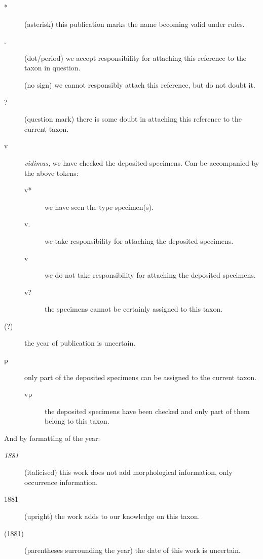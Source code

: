 \documentclass[notuftebib,font=source,UKenglish]{tufte-lualatex}
\begin{document}
\begin{description}
    \item[*] (asterisk) this publication marks the name becoming valid under
         rules.
    \item[.] (dot/period) we accept responsibility for attaching this reference
        to the taxon in question.
    \item[] (no sign) we cannot responsibly attach this reference, but do not
        doubt it.
    \item[?] (question mark) there is some doubt in attaching this reference to
        the current taxon.
    \item[v] \emph{vidimus,} we have checked the deposited specimens. Can be
        accompanied by the above tokens:
        \begin{description}
            \item[v*] we have seen the type specimen(s).
            \item[v.] we take responsibility for attaching the deposited specimens.
            \item[v] we do not take responsibility for attaching the deposited
                specimens.
            \item[v?] the specimens cannot be certainly assigned to this taxon.
        \end{description}
    \item[(?)] the year of publication is uncertain.
    \item[p] only part of the deposited specimens can be assigned to the current
        taxon.
        \begin{description}
            \item[vp] the deposited specimens have been checked and only part of
                them belong to this taxon.
        \end{description}
\end{description}

And by formatting of the year:

\begin{description}
    \item[\emph{1881}] (italicised) this work does not add morphological
        information, only occurrence information.
    \item[1881] (upright) the work adds to our knowledge on this taxon.
    \item[(1881)] (parentheses surrounding the year) the date of this work is
        uncertain.
\end{description}
\end{document}
